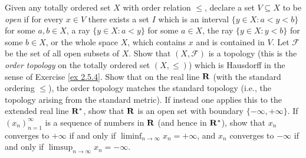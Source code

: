 \begin{exercise}\label{ex 2.5.5}
    Given any totally ordered set \(X\) with order relation \(\leq\), declare a set \(V \subseteq X\) to be \emph{open} if for every \(x \in V\) there exists a set \(I\) which is an interval \(\{y \in X : a < y < b\}\) for some \(a, b \in X\), a ray \(\{y \in X : a < y\}\) for some \(a \in X\), the ray \(\{y \in X : y < b\}\) for some \(b \in X\), or the whole space \(X\), which contains \(x\) and is contained in \(V\).
    Let \(\mathcal{F}\) be the set of all open subsets of \(X\).
    Show that \((X, \mathcal{F})\) is a topology (this is the \emph{order topology} on the totally ordered set \((X, \leq)\)) which is Hausdorff in the sense of Exercise \ref{ex 2.5.4}.
    Show that on the real line \(\mathbf{R}\) (with the standard ordering \(\leq\)), the order topology matches the standard topology (i.e., the topology arising from the standard metric).
    If instead one applies this to the extended real line \(\mathbf{R}^*\), show that \(\mathbf{R}\) is an open set with boundary \(\{-\infty, +\infty\}\).
    If \((x_n)_{n = 1}^\infty\) is a sequence of numbers in \(\mathbf{R}\) (and hence in \(\mathbf{R}^*\)), show that \(x_n\) converges to \(+\infty\) if and only if \(\liminf_{n \to \infty} x_n = +\infty\), and \(x_n\) converges to \(-\infty\) if and only if \(\limsup_{n \to \infty} x_n = -\infty\).
\end{exercise}

